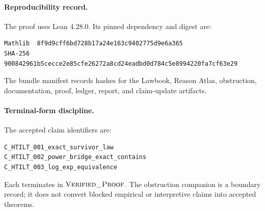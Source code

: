\paragraph{Reproducibility record.}
The proof uses Lean 4.28.0. Its pinned dependency and digest are:
\begin{Verbatim}[fontsize=\scriptsize]
Mathlib  8f9d9cff6bd728b17a24e163c9402775d9e6a365
SHA-256  900842961b5cecce2e85cfe26272a8cd24eadbd0d784c5e8994220fa7cf63e29
\end{Verbatim}
The bundle manifest records hashes for the Lawbook, Reason Atlas, obstruction,
documentation, proof, ledger, report, and claim-update artifacts.

\paragraph{Terminal-form discipline.}
The accepted claim identifiers are:
\begin{Verbatim}[fontsize=\scriptsize]
C_HTILT_001_exact_survivor_law
C_HTILT_002_power_bridge_exact_contains
C_HTILT_003_log_exp_equivalence
\end{Verbatim}
Each terminates in \(\textsc{Verified\_Proof}\). The obstruction companion is a boundary
record; it does not convert blocked empirical or interpretive claims into
accepted theorems.

